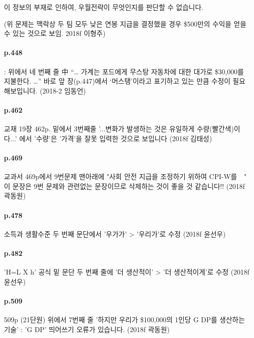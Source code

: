 \documentclass[a4paper]{article}
\begin{document}
이 정보의 부재로 인하여, 우월전략이 무엇인지를 판단할 수 없습니다.

(위 문제는 맥락상 두 팀 모두 낮은 연봉 지급을 결정했을 경우 \$500만의 수익을 얻을 수 있는 것으로 보임. 2018f 이형주)

\paragraph{p.448} %
\label{par:p_448}
: 위에서 네 번째 줄 中 “… 가계는 포드에게 무스탕 자동차에 대한 대가로 \$30,000를 지불한다. …”
바로 앞 장(p.447)에서 ‘머스탱’이라고 표기하고 있는 만큼 수정이 필요해보입니다. (2018-2 임동언)

\paragraph{p.462} %
\label{par:p_462}
교재 19장 462p. 밑에서 3번째줄
'...변화가 발생하는 것은 유일하게 수량(빨간색)이다...' 
에서 '수량'은 '가격'을 잘못 입력한 것으로 보입니다 (2018f 김태성)

\paragraph{p.469} %
\label{par:p_469}
교과서 469p에서 9번문제 맨아래에 "사회 안전 지급을 조정하기 위하여 CPI-W를~~" 이 문장은 9번 문제와 관련없는 문장이므로 삭제하는 것이 좋을 것 같습니다!! (2018f 곽동원)

\paragraph{p.478} %
\label{par:p_478}
소득과 생활수준 두 번째 문단에서 '우가가' > '우리가'로 수정 (2018f 윤선우)

\paragraph{p.482} %
\label{par:p_482}
 'H=L X h' 공식 밑 문단 두 번째 줄에 '더 생산적이' > '더 생산적이게'로 수정 (2018f 윤선우)

\paragraph{p.509} %
\label{par:p_509}
509p (21단원) 위에서 7번째 줄
'하지만 우리가 \$100,000의 1인당 G DP를 생산하는 기술' : 'G DP' 띄어쓰기 오류가 있습니다. (2018f 곽동원)
\end{document}
